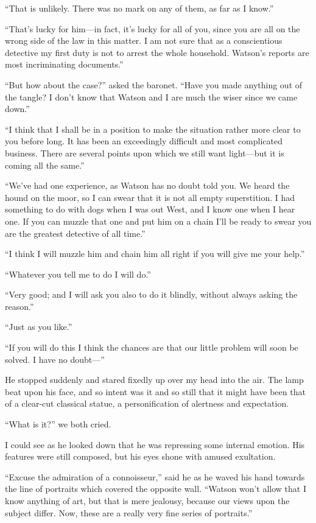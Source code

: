 \documentclass[paper=a5,BCOR=7mm,twoside,DIV=calc,12pt,usegeometry,openany,chapterprefix,endperiod,headings=big]{scrbook} %
\begin{document}
\enquote{That is unlikely. There was no mark on any of them, as far as I know.}

\enquote{That's lucky for him---in fact, it's lucky for all of you, since you are all on the wrong side of the law in this matter. I am not sure that as a conscientious detective my first duty is not to arrest the whole household. Watson's reports are most incriminating documents.}

\enquote{But how about the case?} asked the baronet. \enquote{Have you made anything out of the tangle? I don't know that Watson and I are much the wiser since we came down.}

\enquote{I think that I shall be in a position to make the situation rather more clear to you before long. It has been an exceedingly difficult and most complicated business. There are several points upon which we still want light---but it is coming all the same.}

\enquote{We've had one experience, as Watson has no doubt told you. We heard the hound on the moor, so I can swear that it is not all empty superstition. I had something to do with dogs when I was out West, and I know one when I hear one. If you can muzzle that one and put him on a chain I'll be ready to swear you are the greatest detective of all time.}

\enquote{I think I will muzzle him and chain him all right if you will give me your help.}

\enquote{Whatever you tell me to do I will do.}

\enquote{Very good; and I will ask you also to do it blindly, without always asking the reason.}

\enquote{Just as you like.}

\enquote{If you will do this I think the chances are that our little problem will soon be solved. I have no doubt---}

He stopped suddenly and stared fixedly up over my head into the air. The lamp beat upon his face, and so intent was it and so still that it might have been that of a clear-cut classical statue, a personification of alertness and expectation.



\enquote{What is it?} we both cried.

I could see as he looked down that he was repressing some internal emotion. His features were still composed, but his eyes shone with amused exultation.

\enquote{Excuse the admiration of a connoisseur,} said he as he waved his hand towards the line of portraits which covered the opposite wall. \enquote{Watson won't allow that I know anything of art, but that is mere jealousy, because our views upon the subject differ. Now, these are a really very fine series of portraits.}
\end{document}

